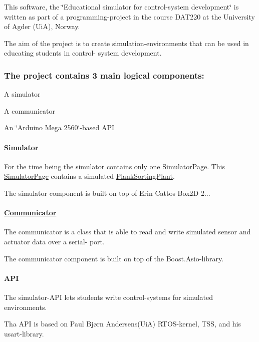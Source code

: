 This software, the \char`\"{}\-Educational simulator for control-\/system development\char`\"{} is written as part of a programming-\/project in the course D\-A\-T220 at the University of Agder (Ui\-A), Norway.

The aim of the project is to create simulation-\/environments that can be used in educating students in control-\/ system development.

\subsubsection*{The project contains 3 main logical components\-:}


\begin{DoxyItemize}
\item A simulator
\item A communicator
\item An \char`\"{}\-Arduino Mega 2560\char`\"{}-\/based A\-P\-I
\end{DoxyItemize}

\paragraph*{Simulator}

For the time being the simulator contains only one \hyperlink{classSimulatorPage}{Simulator\-Page}. This \hyperlink{classSimulatorPage}{Simulator\-Page} contains a simulated \hyperlink{classPlankSortingPlant}{Plank\-Sorting\-Plant}.

The simulator component is built on top of Erin Cattos Box2\-D 2...

\paragraph*{\hyperlink{classCommunicator}{Communicator}}

The communicator is a class that is able to read and write simulated sensor and actuator data over a serial-\/ port.

The communicator component is built on top of the Boost.\-Asio-\/library.

\paragraph*{A\-P\-I}

The simulator-\/\-A\-P\-I lets students write control-\/systems for simulated environments.

Tha A\-P\-I is based on Paul Bjørn Andersens(\-Ui\-A) R\-T\-O\-S-\/kernel, T\-S\-S, and his usart-\/library.

